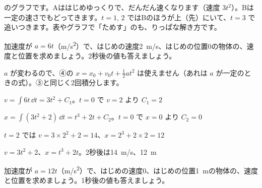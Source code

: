 \noindent\begin{minipage}[c]{0.48\linewidth}
\end{minipage}\hfill
\begin{minipage}[c]{0.5\linewidth}\raggedright
{}のグラフです。Aははじめゆっくりで、だんだん速くなります（速度 $3t^2$）。Bは一定の速さでもどってきます。$t=1,\,2$ ではBのほうが上（先）にいて、$t=3$ で追いつきます。表やグラフで「ためす」のも、りっぱな解き方です。
\end{minipage}

\begin{reidai}[加速度が変わるとき]
加速度が $a=6t$（\unit{m/s^2}）で、はじめの速度\qty{2}{m/s}、はじめの位置0の物体の、速度と位置を求めましょう。2秒後の値も答えましょう。\par
\kangaekata $a$ が変わるので、④の $x=x_0+v_0t+\frac{1}{2}at^2$ は使えません（あれは $a$ が一定のときの式）。③と同じく2回積分します。\par
\shiki $\displaystyle v=\int6t\,\dd t=3t^2+C_1$。$t=0$ で $v=2$ より $C_1=2$\par
\hspace*{2.6\zw}$\displaystyle x=\int(3t^2+2)\,\dd t=t^3+2t+C_2$。$t=0$ で $x=0$ より $C_2=0$\par
\hspace*{2.6\zw}$t=2$ では $v=3\times2^2+2=14$、$x=2^3+2\times2=12$\par
\kotae $v=3t^2+2$、$x=t^3+2t$。2秒後は\qty{14}{m/s}、\qty{12}{m}
\end{reidai}

\begin{jibun}
加速度が $a=12t$（\unit{m/s^2}）で、はじめの速度0、はじめの位置\qty{1}{m}の物体の、速度と位置を求めましょう。1秒後の値も答えましょう。
\end{jibun}


